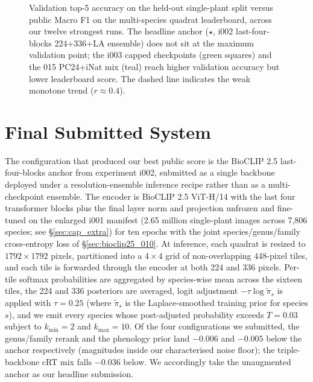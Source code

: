 \documentclass[sigconf]{ceurart}
\begin{document}
\begin{figure}[!htbp]
  \centering
  
  \caption{Validation top-5 accuracy on the held-out single-plant split versus public Macro F1 on the multi-species quadrat leaderboard, across our twelve strongest runs. The headline anchor ($\star$, i002 last-four-blocks 224+336+LA ensemble) does not sit at the maximum validation point; the i003 capped checkpoints (green squares) and the 015 PC24+iNat mix (teal) reach higher validation accuracy but lower leaderboard score. The dashed line indicates the weak monotone trend ($r \approx 0.4$).}
  \label{fig:val_vs_kaggle}
\end{figure}
\section{Final Submitted System}
\label{sec:final_submission}
The configuration that produced our best public score is the BioCLIP 2.5 last-four-blocks anchor from experiment i002, submitted as a single backbone deployed under a resolution-ensemble inference recipe rather than as a multi-checkpoint ensemble. The encoder is BioCLIP 2.5 ViT-H/14 with the last four transformer blocks plus the final layer norm and projection unfrozen and fine-tuned on the enlarged i001 manifest (2.65 million single-plant images across 7,806 species; see \S\ref{sec:cap_extra}) for ten epochs with the joint species/genus/family cross-entropy loss of \S\ref{sec:bioclip25_010}. At inference, each quadrat is resized to $1792 \times 1792$ pixels, partitioned into a $4 \times 4$ grid of non-overlapping $448$-pixel tiles, and each tile is forwarded through the encoder at both $224$ and $336$ pixels. Per-tile softmax probabilities are aggregated by species-wise mean across the sixteen tiles, the 224 and 336 posteriors are averaged, logit adjustment $-\tau \log \tilde{\pi}_s$ is applied with $\tau{=}0.25$ (where $\tilde{\pi}_s$ is the Laplace-smoothed training prior for species $s$), and we emit every species whose post-adjusted probability exceeds $T{=}0.03$ subject to $k_{\min}{=}2$ and $k_{\max}{=}10$. Of the four configurations we submitted, the genus/family rerank and the phenology prior land $-0.006$ and $-0.005$ below the anchor respectively (magnitudes inside our characterised noise floor); the triple-backbone cRT mix falls $-0.036$ below. We accordingly take the unaugmented anchor as our headline submission.
\end{document}
